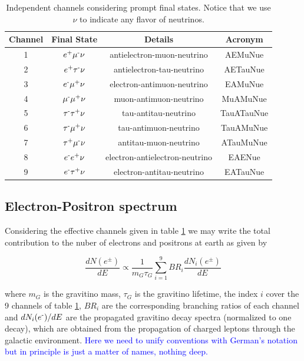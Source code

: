 \documentclass[a4paper,11pt]{article}
\newcommand*{\blue}{\textcolor{blue}}
\begin{document}
\begin{table}
\centering{}%
\begin{tabular}{|c|c|c|c|}
\hline 
Channel & Final State & Details & Acronym\tabularnewline
\hline 
\hline 
1 & $e\text{\textsuperscript{+}}\mu\text{\textsuperscript{-}}\nu$ & antielectron-muon-neutrino & AEMuNue\tabularnewline
\hline 
2 & $e\text{\textsuperscript{+}}\tau\text{\textsuperscript{-}}\nu$ & antielectron-tau-neutrino & AETauNue\tabularnewline
\hline 
3 & $e\text{\textsuperscript{-}}\mu\text{\textsuperscript{+}}\nu$ & electron-antimuon-neutrino & EAMuNue\tabularnewline
\hline 
4 & $\mu\text{\textsuperscript{-}}\mu\text{\textsuperscript{+}}\nu$ & muon-antimuon-neutrino & MuAMuNue\tabularnewline
\hline 
5 & $\tau\text{\textsuperscript{-}}\tau\text{\textsuperscript{+}}\nu$ & tau-antitau-neutrino & TauATauNue\tabularnewline
\hline 
6 & $\tau\text{\textsuperscript{-}}\mu\text{\textsuperscript{+}}\nu$ & tau-antimuon-neutrino & TauAMuNue\tabularnewline
\hline 
7 & $\tau\text{\textsuperscript{+}}\mu\text{\textsuperscript{-}}\nu$ & antitau-muon-neutrino & ATauMuNue\tabularnewline
\hline 
8 & $e\text{\textsuperscript{-}}e\text{\textsuperscript{+}}\nu$ & electron-antielectron-neutrino & EAENue\tabularnewline
\hline 
9 & $e\text{\textsuperscript{-}}\tau\text{\textsuperscript{+}}\nu$ & electron-antitau-neutrino & EATauNue\tabularnewline
\hline 
\end{tabular}\caption{\label{tab:Independent-channels-prompt-final-states}Independent channels
considering prompt final states. Notice that we use $\nu$ to indicate
any flavor of neutrinos. }
\end{table}

\subsection{Electron-Positron spectrum}

Considering the effective channels given in table \ref{tab:Independent-channels-prompt-final-states} we may write the total contribution to the nuber of electrons and positrons at earth as given by 

\begin{equation}
\frac{dN(e^\pm)}{dE}\propto\frac{1}{m_{G}\tau_{G}}\sum_{i=1}^{9}BR_{i}\frac{dN_{i}(e^\pm)}{dE}
\label{eq:eleposgrav}
\end{equation}

\noindent where $m_{G}$ is the gravitino mass, $\tau_{G}$ is the gravitino lifetime, the index $i$ cover the 9 channels of table \ref{tab:Independent-channels-prompt-final-states}, $BR_{i}$ are the corresponding branching ratios of each channel and
$dN_{i}(e\text{\textsuperscript{-}})/dE$ are the propagated gravitino decay spectra (normalized to one decay), which are obtained from the
propagation of charged leptons through the galactic environment. \blue{Here we need to unify conventions with German's notation but in principle
is just a matter of names, nothing deep.}
\end{document}
